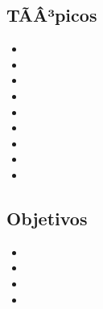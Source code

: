 \subsection*{TÃÂ³picos}
\begin{itemize}
	\item \NCCINCOTopicProtocolos
	\item \NCCINCOTopicPrincipios
	\item \NCCINCOTopicSitios
	\item \NCCINCOTopicLlamadas
	\item \NCCINCOTopicObjetos
	\item \NCCINCOTopicEl
	\item \NCCINCOTopicHerramientas
	\item \NCCINCOTopicTopicos
	\item \NCCINCOTopicAplicaciones
\end{itemize}

\subsection*{Objetivos}
\begin{itemize}
	\item \NCCINCOObjUNO
	\item \NCCINCOObjDOS
	\item \NCCINCOObjTRES
	\item \NCCINCOObjCUATRO
\end{itemize}

\subsection{\NCSEISDef}\label{sec:BOK-NC6}

